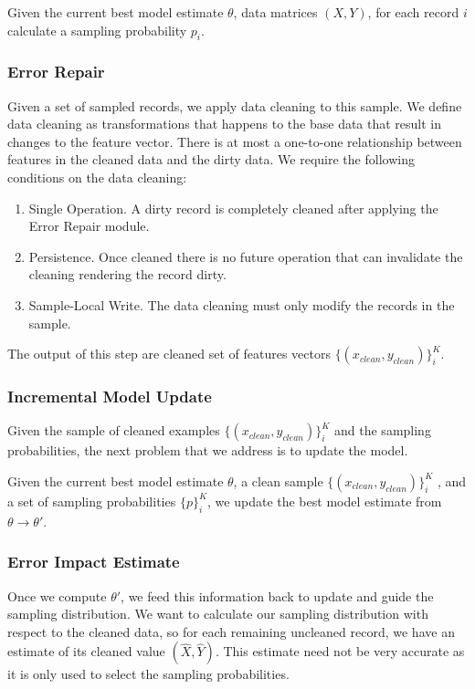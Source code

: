 \begin{problem}\label{imp-samp}\sloppy
Given the current best model estimate $\theta$, data matrices $(X,Y)$, for each record $i$ calculate a sampling probability $p_i$.
\end{problem}

\subsubsection{Error Repair}
Given a set of sampled records, we apply data cleaning to this sample.
We define data cleaning as transformations that happens to the base data that result in changes to the feature vector. 
There is at most a one-to-one relationship between features in the cleaned data and the dirty data.
We require the following conditions on the data cleaning:
\begin{enumerate}
\item Single Operation. A dirty record is completely cleaned after applying the Error Repair module.
\item Persistence. Once cleaned there is no future operation that can invalidate the cleaning rendering the record dirty.
\item Sample-Local Write. The data cleaning must only modify the records in the sample.
\end{enumerate}
The output of this step are cleaned set of features vectors $\{(x_{clean},y_{clean})\}^K_i$.

\subsubsection{Incremental Model Update}
Given the sample of cleaned examples $\{(x_{clean},y_{clean})\}^K_i$ and the sampling probabilities, the next problem that we address is to update the model.

\begin{problem}\label{imp-update}\sloppy
Given the current best model estimate $\theta$, a clean sample $\{(x_{clean},y_{clean})\}^K_i$ , and a set of sampling probabilities $\{p\}^K_i$, we update the best model estimate from $\theta \rightarrow \theta'$.
\end{problem}

\subsubsection{Error Impact Estimate}
Once we compute $\theta'$, we feed this information back to update and guide the sampling distribution.
We want to calculate our sampling distribution with respect to the cleaned data, so for each remaining uncleaned record, we have an estimate of its cleaned value $(\hat{X},\hat{Y})$.
This estimate need not be very accurate as it is only used to select the sampling probabilities.

